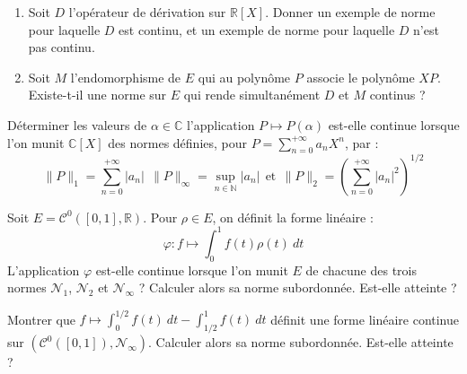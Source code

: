 \documentclass[french,a4paper]{article}
\newcommand{\N}{\mathbb{N}}
\newcommand{\R}{\mathbb{R}}
\newcommand{\C}{\mathbb{C}}
\theoremstyle{plain}
\theoremstyle{definition}
\theoremstyle{remark}
\begin{document}
\begin{ex}{}
	\begin{enumerate}
		\item Soit $D$ l'opérateur de dérivation sur $\R[X]$. Donner un exemple de norme pour laquelle $D$ est continu, et un exemple de norme pour laquelle $D$ n'est pas continu.
		\item Soit $M$ l'endomorphisme de $E$ qui au polynôme $P$ associe le polynôme $XP$. Existe-t-il une norme sur $E$ qui rende simultanément $D$ et $M$ continus ?
	\end{enumerate}
\end{ex}

\begin{ex}{}
	Déterminer les valeurs de $\alpha\in\C$ l'application $P\mapsto P(\alpha)$ est-elle continue lorsque l'on munit $\C[X]$ des normes définies, pour $P=\displaystyle\sum_{n=0}^{+\infty}a_nX^n$, par : $$\lVert P\rVert_1=\sum_{n=0}^{+\infty}\lvert a_n\rvert \ \ \lVert P\rVert_\infty=\underset{n\in\N}{\sup}\lvert a_n\rvert\ \ \text{et}\ \ \lVert P\rVert_2=\left(\sum_{n=0}^{+\infty}\lvert a_n\rvert^2\right)^{1/2}$$
\end{ex}

\begin{ex}{}
	Soit $E=\mathcal{C}^0([0,1],\R)$. Pour $\rho\in E$, on définit la forme linéaire : $$\varphi: f\mapsto\int_{0}^{1}f(t)\rho(t)\ dt$$ L'application $\varphi$ est-elle continue lorsque l'on munit $E$ de chacune des trois normes $\mathcal{N}_1$, $\mathcal{N}_2$ et $\mathcal{N}_\infty$ ? Calculer alors sa norme subordonnée. Est-elle atteinte ? 
\end{ex}

\begin{ex}{}
	Montrer que $f\mapsto\displaystyle\int_{0}^{1/2}f(t)\ dt-\int_{1/2}^{1}f(t)\ dt$ définit une forme linéaire continue sur $\left(\mathcal{C}^0([0,1]),\mathcal{N}_\infty\right)$. Calculer alors sa norme subordonnée. Est-elle atteinte ?
\end{ex}
\end{document}
